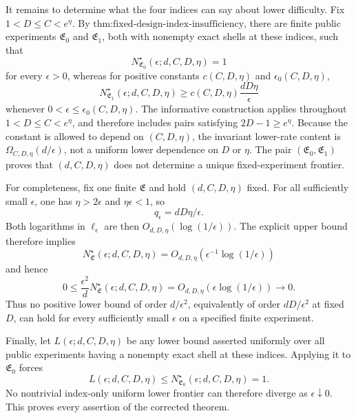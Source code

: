 It remains to determine what the four indices can say about lower difficulty. Fix \(1<D\le C<e^\eta\). By \(\text{thm:fixed-design-index-insufficiency}\), there are finite public experiments \(\mathfrak E_0\) and \(\mathfrak E_1\), both with nonempty exact shells at these indices, such that
\[
N^\star_{\mathfrak E_0}(\epsilon;d,C,D,\eta)=1
\]
for every \(\epsilon>0\), whereas for positive constants \(c(C,D,\eta)\) and \(\epsilon_0(C,D,\eta)\),
\[
N^\star_{\mathfrak E_1}(\epsilon;d,C,D,\eta)
\ge c(C,D,\eta)\frac{dD\eta}{\epsilon}
\]
whenever \(0<\epsilon\le\epsilon_0(C,D,\eta)\). The informative construction applies throughout \(1<D\le C<e^\eta\), and therefore includes pairs satisfying \(2D-1\ge e^\eta\). Because the constant is allowed to depend on \((C,D,\eta)\), the invariant lower-rate content is \(\Omega_{C,D,\eta}(d/\epsilon)\), not a uniform lower dependence on \(D\) or \(\eta\). The pair \((\mathfrak E_0,\mathfrak E_1)\) proves that \((d,C,D,\eta)\) does not determine a unique fixed-experiment frontier.

For completeness, fix one finite \(\mathfrak E\) and hold \((d,C,D,\eta)\) fixed. For all sufficiently small \(\epsilon\), one has \(\eta>2\epsilon\) and \(\eta\epsilon<1\), so
\[
q_\epsilon=dD\eta/\epsilon.
\]
Both logarithms in \(\ell_\epsilon\) are then \(O_{d,D,\eta}(\log(1/\epsilon))\). The explicit upper bound therefore implies
\[
N^\star_{\mathfrak E}(\epsilon;d,C,D,\eta)
=O_{d,D,\eta}\!\left(\epsilon^{-1}\log(1/\epsilon)\right)
\]
and hence
\[
0\le
\frac{\epsilon^2}{d}N^\star_{\mathfrak E}(\epsilon;d,C,D,\eta)
=O_{d,D,\eta}\!\left(\epsilon\log(1/\epsilon)\right)
\longrightarrow0.
\]
Thus no positive lower bound of order \(d/\epsilon^2\), equivalently of order \(dD/\epsilon^2\) at fixed \(D\), can hold for every sufficiently small \(\epsilon\) on a specified finite experiment.

Finally, let \(L(\epsilon;d,C,D,\eta)\) be any lower bound asserted uniformly over all public experiments having a nonempty exact shell at these indices. Applying it to \(\mathfrak E_0\) forces
\[
L(\epsilon;d,C,D,\eta)
\le N^\star_{\mathfrak E_0}(\epsilon;d,C,D,\eta)=1.
\]
No nontrivial index-only uniform lower frontier can therefore diverge as \(\epsilon\downarrow0\). This proves every assertion of the corrected theorem.